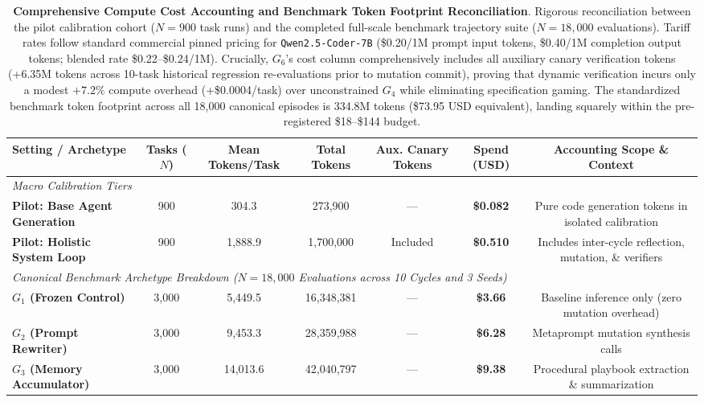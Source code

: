 \begin{table}[t]
\centering
\small
\caption{\textbf{Comprehensive Compute Cost Accounting and Benchmark Token Footprint Reconciliation}. Rigorous reconciliation between the pilot calibration cohort ($N=900$ task runs) and the completed full-scale benchmark trajectory suite ($N=18{,}000$ evaluations). Tariff rates follow standard commercial pinned pricing for \texttt{Qwen2.5-Coder-7B} (\$0.20/1M prompt input tokens, \$0.40/1M completion output tokens; blended rate \$0.22--\$0.24/1M). Crucially, $G_6$'s cost column comprehensively includes all auxiliary canary verification tokens (+6.35M tokens across 10-task historical regression re-evaluations prior to mutation commit), proving that dynamic verification incurs only a modest $+7.2\%$ compute overhead (+\$0.0004/task) over unconstrained $G_4$ while eliminating specification gaming. The standardized benchmark token footprint across all 18,000 canonical episodes is 334.8M tokens (\$73.95 USD equivalent), landing squarely within the pre-registered \$18--\$144 budget.}
\label{tab:cost_reconciliation}
\begin{tabular}{lcccccc}
\toprule
\textbf{Setting / Archetype} & \textbf{Tasks ($N$)} & \textbf{Mean Tokens/Task} & \textbf{Total Tokens} & \textbf{Aux. Canary Tokens} & \textbf{Spend (USD)} & \textbf{Accounting Scope \& Context} \\
\midrule
\multicolumn{7}{l}{\textit{Macro Calibration Tiers}} \\
\textbf{Pilot: Base Agent Generation} & 900 & 304.3 & 273,900 & --- & \textbf{\$0.082} & Pure code generation tokens in isolated calibration \\
\textbf{Pilot: Holistic System Loop} & 900 & 1,888.9 & 1,700,000 & Included & \textbf{\$0.510} & Includes inter-cycle reflection, mutation, \& verifiers \\
\midrule
\multicolumn{7}{l}{\textit{Canonical Benchmark Archetype Breakdown ($N=18{,}000$ Evaluations across 10 Cycles and 3 Seeds)}} \\
\textbf{$G_1$ (Frozen Control)} & 3,000 & 5,449.5 & 16,348,381 & --- & \textbf{\$3.66} & Baseline inference only (zero mutation overhead) \\
\textbf{$G_2$ (Prompt Rewriter)} & 3,000 & 9,453.3 & 28,359,988 & --- & \textbf{\$6.28} & Metaprompt mutation synthesis calls \\
\textbf{$G_3$ (Memory Accumulator)} & 3,000 & 14,013.6 & 42,040,797 & --- & \textbf{\$9.38} & Procedural playbook extraction \& summarization \\

\end{tabular}
\end{table}
